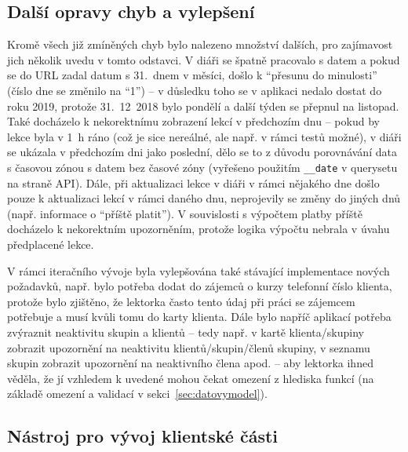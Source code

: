 \subsection{Další opravy chyb a vylepšení}

Kromě všech již zmíněných chyb bylo nalezeno množství dalších, pro zajímavost jich několik uvedu v tomto odstavci. V diáři se špatně pracovalo s datem a pokud se do URL zadal datum s 31.~dnem v měsíci, došlo k \enquote{přesunu do minulosti} (číslo dne se změnilo na \enquote{1}) -- v důsledku toho se v aplikaci nedalo dostat do roku 2019, protože 31.~12~2018 bylo pondělí a další týden se přepnul na listopad. Také docházelo k nekorektnímu zobrazení lekcí v předchozím dnu -- pokud by lekce byla v 1~h ráno (což je sice nereálné, ale např. v rámci testů možné), v diáři se ukázala v předchozím dni jako poslední, dělo se to z důvodu porovnávání data s časovou zónou s datem bez časové zóny (vyřešeno použitím \verb|__date| v querysetu na straně API). Dále, při aktualizaci lekce v diáři v rámci nějakého dne došlo pouze k aktualizaci lekcí v rámci daného dnu, neprojevily se změny do jiných dnů (např. informace o \enquote{příště platit}). V souvislosti s výpočtem platby příště docházelo k nekorektním upozorněním, protože logika výpočtu nebrala v úvahu předplacené lekce.

V rámci iteračního vývoje byla vylepšována také stávající implementace nových požadavků, např. bylo potřeba dodat do zájemců o kurzy telefonní číslo klienta, protože bylo zjištěno, že lektorka často tento údaj při práci se zájemcem potřebuje a musí kvůli tomu do karty klienta. Dále bylo napříč aplikací potřeba zvýraznit neaktivitu skupin a klientů -- tedy např. v kartě klienta/skupiny zobrazit upozornění na neaktivitu klientů/skupin/členů skupiny, v seznamu skupin zobrazit upozornění na neaktivního člena apod. -- aby lektorka ihned věděla, že jí vzhledem k uvedené mohou čekat omezení z hlediska funkcí (na základě omezení a validací v sekci~\ref{sec:datovymodel}).

\subsection{Nástroj pro vývoj klientské části}

